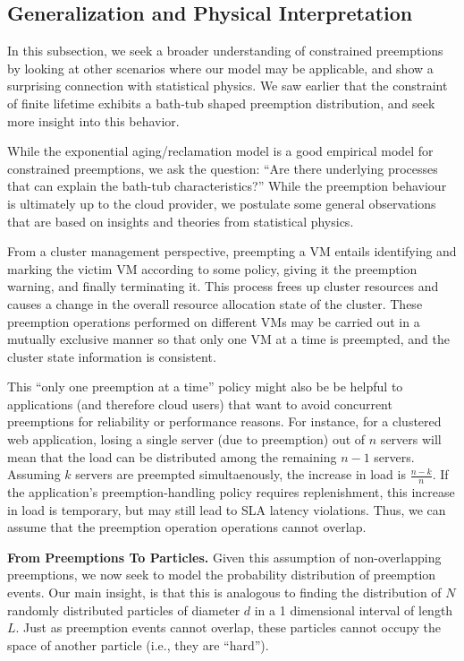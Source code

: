 \subsection{Generalization and Physical Interpretation}

In this subsection, we seek a broader understanding of constrained preemptions by looking at other scenarios where our model may be applicable, and show a surprising connection with statistical physics. 
We saw earlier that the constraint of finite lifetime exhibits a bath-tub shaped preemption distribution, and seek more insight into this behavior. 



While the exponential aging/reclamation model is a good empirical  model for constrained preemptions, we ask the question: ``Are there underlying processes that can explain the bath-tub characteristics?''
While the preemption behaviour is ultimately up to the cloud provider, we postulate some general observations that are based on insights and theories from statistical physics. 


From a cluster management perspective, preempting a VM entails identifying and marking the victim VM according to some policy, giving it the preemption warning, and finally terminating it. 
This process frees up cluster resources and causes a change in the overall resource allocation state of the cluster. 
These preemption operations performed on different VMs may be carried out in a mutually exclusive manner so that only one VM at a time is preempted, and the cluster state information is consistent. 


This ``only one preemption at a time'' policy might also be be helpful to applications (and therefore cloud users) that want to avoid concurrent preemptions for reliability or performance reasons.
For instance, for a clustered web application, losing a single server (due to preemption) out of $n$ servers will mean that the load can be distributed among the remaining $n-1$ servers. 
Assuming $k$ servers are preempted simultaenously, the increase in load is $\frac{n-k}{n}$.
If the application's preemption-handling policy requires replenishment, this increase in load is temporary, but may still lead to SLA latency violations. 
Thus, we can assume that the preemption operation operations cannot overlap.


\noindent \textbf{From Preemptions To Particles.}
Given this assumption of non-overlapping preemptions, we now seek to model the probability distribution of preemption events. 
Our main insight, is that this is analogous to finding the distribution of $N$ randomly distributed  particles of diameter $d$ in a 1 dimensional interval of length $L$. 
Just as preemption events cannot overlap, these particles cannot occupy the space of another particle (i.e., they are ``hard''). 


